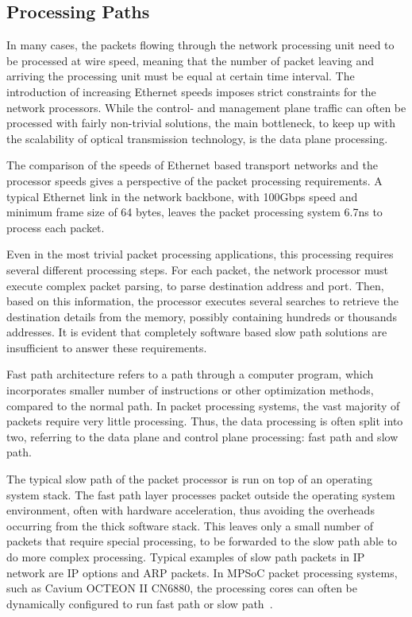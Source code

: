 \subsection{Processing Paths}
In many cases, the packets flowing through the network processing unit need to be processed at wire speed, meaning that the number of packet leaving and arriving the processing unit must be equal at certain time interval. The introduction of increasing Ethernet speeds imposes strict constraints for the network processors. While the control- and management plane traffic can often be processed with fairly non-trivial solutions, the main bottleneck, to keep up with the scalability of optical transmission technology, is the data plane processing.~\cite{Giladi:2008:Network}

The comparison of the speeds of Ethernet based transport networks and the processor speeds gives a perspective of the packet processing requirements. A typical Ethernet link in the network backbone, with 100Gbps speed and minimum frame size of 64 bytes, leaves the packet processing system 6.7ns to process each packet.~\cite{Giladi:2008:Network}

Even in the most trivial packet processing applications, this processing requires several different processing steps. For each packet, the network processor must execute complex packet parsing, to parse destination address and port. Then, based on this information, the processor executes several searches to retrieve the destination details from the memory, possibly containing hundreds or thousands addresses. It is evident that completely software based slow path solutions are insufficient to answer these requirements.~\cite{Giladi:2008:Network}

Fast path architecture refers to a path through a computer program, which incorporates smaller number of instructions or other optimization methods, compared to the normal path. In packet processing systems, the vast majority of packets require very little processing. Thus, the data processing is often split into two, referring to the data plane and control plane processing: fast path and slow path.~\cite{6wind:2016:FP, Giladi:2008:Network}

The typical slow path of the packet processor is run on top of an operating system stack. The fast path layer processes packet outside the operating system environment, often with hardware acceleration, thus avoiding the overheads occurring from the thick software stack. This leaves only a small number of packets that require special processing, to be forwarded to the slow path able to do more complex processing. Typical examples of slow path packets in IP network are IP options and ARP packets. In MPSoC packet processing systems, such as Cavium OCTEON II CN6880, the processing cores can often be dynamically configured to run fast path or slow path~\cite{cavium:2010:fundamentals}.~\cite{6wind:2016:FP, Giladi:2008:Network}


